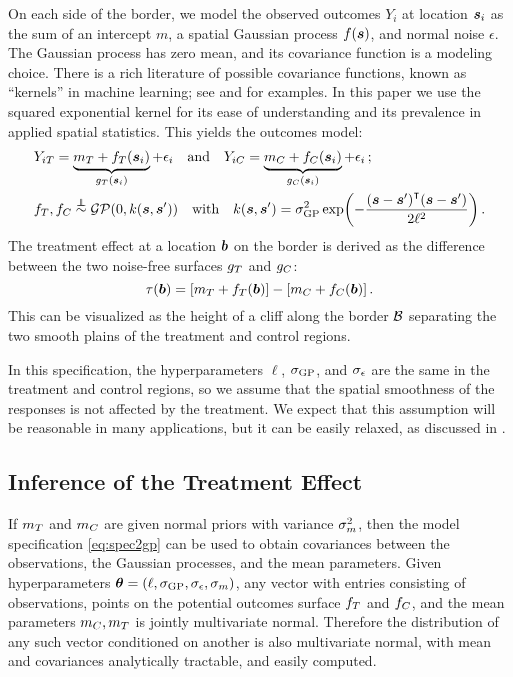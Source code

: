 On each side of the border, we model the observed outcomes \(Y_i\) at location \(\bm{s}_i\) as the sum of an intercept \(m\), a spatial Gaussian process \(f(\bm{s})\), and \iid{} normal noise \(\epsilon\).
The Gaussian process has zero mean, and its covariance function is a modeling choice.
There is a rich literature of possible covariance functions, known as ``kernels'' in machine learning; see
\citet{banerjee2014hierarchical} and \citet{rasmussen2006gaussian} for examples.
In this paper we use the squared exponential kernel for its ease of understanding and its prevalence in applied spatial statistics.
This yields the outcomes model:
\begin{equation}
    \begin{split}
        & Y_{i\treat} = \underbrace{m_\treat{} + f_\treat{}(\svec_i)}_{g_\treat{}(\svec_i)} + \epsilon_i \quad\text{and}\quad
        Y_{i\ctrol} = \underbrace{m_\ctrol{} + f_\ctrol{}(\svec_i)}_{g_\ctrol{}(\svec_i)} + \epsilon_i \,; \\
        & f_\treat{}, f_\ctrol{} \overset{\indep}{\sim} \GP\del{0, k(\svec, \svec')} \quad\text{with}\quad
        k(\svec,\svec') = \sigmaf^2 \exp\del{ - \frac{\del{\svec-\svec'}\trans\del{\svec-\svec'}}{2 \ell^2}} \,.
    \end{split}
    \label{eq:spec2gp}
\end{equation}
The treatment effect at a location \(\bm{b}\) on the border is derived as the difference between the two noise-free surfaces \(g_T{}\) and \(g_C{}\):
\begin{equation}
    \tau(\sentinel) = \sbr{m_\treat{} + f_\treat{}(\sentinel)} - \sbr{m_\ctrol{} + f_\ctrol{}(\sentinel)}\,.
\end{equation}
This can be visualized as the height of a cliff along the border \(\mathcal{B}\) separating the two smooth plains of the treatment and control regions.

In this specification, the hyperparameters \(\ell\), \(\sigma_{\mathrm{GP}}\), and \(\sigma_{\epsilon}\) are the same in the treatment and control regions, so we assume that the spatial smoothness of the responses is not affected by the treatment.
We expect that this assumption will be reasonable in many applications, but it can be easily relaxed, as discussed in \citet{Branson:2017qy}.

\subsection{Inference of the Treatment Effect}
\label{sec:inference}
If \(m_T\) and \(m_C\) are given normal priors with variance \(\sigma_{m}^2\), then the model specification \autoref{eq:spec2gp} can be used to obtain covariances between the observations, the Gaussian processes, and the mean parameters.
Given hyperparameters \(\bm{\theta} = \left\lparen\ell,\sigma_{\mathrm{GP}}, \sigma_{\epsilon}, \sigma_{m}\right\rparen\), any vector with entries consisting of observations, points on the potential outcomes surface \(f_{T}\) and \(f_{C}\), and the mean parameters \(m_{C}, m_{T}\) is jointly multivariate normal. Therefore the distribution of any such vector conditioned on another is also multivariate normal, with mean and covariances analytically tractable, and easily computed.

